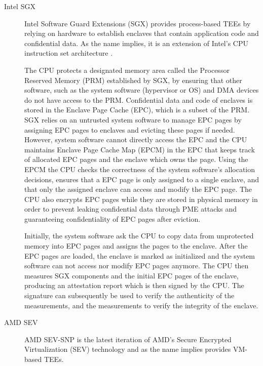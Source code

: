 \begin{description}
  \item[Intel SGX]
    Intel Software Guard Extensions (SGX) provides process-based TEEs by relying
    on hardware to establish enclaves that contain application code and
    confidential data. As the name implies, it is an extension of Intel's CPU
    instruction set architecture \cite{costan2016sgx}.

    The CPU protects a designated memory area called the Processor Reserved
    Memory (PRM) established by SGX, by ensuring that other software, such as
    the system software (hypervisor or OS) and DMA devices do not have access to
    the PRM. Confidential data and code of enclaves is stored in the Enclave
    Page Cache (EPC), which is a subset of the PRM. SGX relies on an untrusted
    system software to manage EPC pages by assigning EPC pages to enclaves and
    evicting these pages if needed. However, system software cannot directly
    access the EPC and the CPU maintains Enclave Page Cache Map (EPCM) in the
    EPC that keeps track of allocated EPC pages and the enclave which owns the
    page. Using the EPCM the CPU checks the correctness of the system software's
    allocation decisions, ensures that a EPC page is only assigned to a single
    enclave, and that only the assigned enclave can access and modify the EPC
    page. The CPU also encrypts EPC pages while they are stored in physical
    memory in order to prevent leaking confidential data through PME attacks and
    guaranteeing confidentiality of EPC pages after eviction.

    Initially, the system software ask the CPU to copy data from unprotected
    memory into EPC pages and assigns the pages to the enclave. After the EPC
    pages are loaded, the enclave is marked as initialized and the system
    software can not access nor modify EPC pages anymore. The CPU then measures
    SGX components and the initial EPC pages of the enclave, producing an
    attestation report which is then signed by the CPU. The signature can
    subsequently be used to verify the authenticity of the measurements, and the
    measurements to verify the integrity of the enclave.

  \item[AMD SEV]
    AMD SEV-SNP is the latest iteration of AMD's Secure Encrypted Virtualization
    (SEV) technology \cite{amd2021sev, amd2017seves, amd2020sevsnp} and as the
    name implies provides VM-based TEEs.


\end{description}
